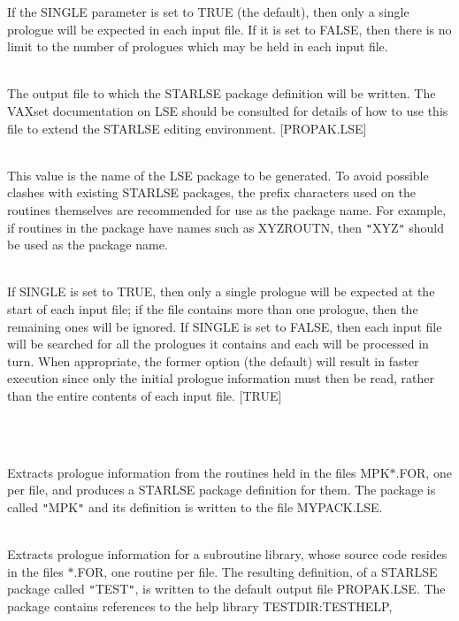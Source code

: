 \documentclass[twoside,11pt]{article}
\renewcommand{\_}{\texttt{\symbol{95}}}
\newlength{\sstexampleslength}
\newcommand{\sstexamples}[1]{
   \item[Examples:] \mbox{} \\
   \vspace{-3.5ex}
   \begin{description}
      #1
   \end{description}
}
\newcommand{\sstsubsection}[1]{ \item[{#1}] \mbox{} \\}
\newcommand{\sstexamplesubsection}[2]{\sloppy
\item[\parbox{\sstexampleslength}{\ssttt #1}] \mbox{} \vspace{1.0ex}
\\ #2 }
\newcommand{\sstexamples}[1]{
      \item[Examples:] \\
      \begin{description}
         #1
      \end{description}
      \\
   }
\newcommand{\sstsubsection}[1]{\item[{#1}]}
\newcommand{\sstexamplesubsection}[2]{\item[{\ssttt #1}] #2}
\begin{document}
{{{         If the SINGLE parameter is set to TRUE (the default), then
         only a single prologue will be expected in each input file. If
         it is set to FALSE, then there is no limit to the number of
         prologues which may be held in each input file.
      }
      \sstsubsection{
         OUT = FILE (Write)
      }{
         The output file to which the STARLSE package definition will
         be written.  The VAXset documentation on LSE should be
         consulted for details of how to use this file to extend the
         STARLSE editing environment. [PROPAK.LSE]
      }
      \sstsubsection{
         PACK = LITERAL (Read)
      }{
         This value is the name of the LSE package to be generated. To
         avoid possible clashes with existing STARLSE packages, the
         prefix characters used on the routines themselves are
         recommended for use as the package name. For example, if
         routines in the package have names such as XYZ\_ROUTN, then
         {\tt "}XYZ{\tt "} should be used as the package name.
      }
      \sstsubsection{
         SINGLE = \_LOGICAL (Read)
      }{
         If SINGLE is set to TRUE, then only a single prologue will be
         expected at the start of each input file; if the file contains
         more than one prologue, then the remaining ones will be
         ignored. If SINGLE is set to FALSE, then each input file will
         be searched for all the prologues it contains and each will be
         processed in turn. When appropriate, the former option (the
         default) will result in faster execution since only the
         initial prologue information must then be read, rather than
         the entire contents of each input file.  [TRUE]
      }
   }
   \sstexamples{
      \sstexamplesubsection{
         PROPAK MPK\_$*$.FOR MYPACK.LSE MPK
      }{
         Extracts prologue information from the routines held in the
         files MPK\_$*$.FOR, one per file, and produces a STARLSE package
         definition for them. The package is called {\tt "}MPK{\tt "} and its
         definition is written to the file MYPACK.LSE.
      }
      \sstexamplesubsection{
         PROPAK $*$.FOR PACK=TEST HELP=TEST\_DIR:TESTHELP
      }{
         Extracts prologue information for a subroutine library, whose
         source code resides in the files $*$.FOR, one routine per file.
         The resulting definition, of a STARLSE package called {\tt "}TEST{\tt "},
         is written to the default output file PROPAK.LSE. The package
         contains references to the help library TEST\_DIR:TESTHELP,
}}}
\end{document}

